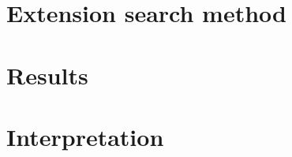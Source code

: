 \documentclass[12pt]{article}
\begin{document}
\section{Extension search method}



\section{Results}

\section{Interpretation}
\end{document}
